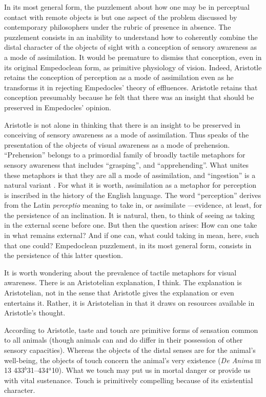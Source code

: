 In its most general form, the puzzlement about how one may be in perceptual contact with remote objects is but one aspect of the problem discussed by contemporary philosophers under the rubric of presence in absence. The puzzlement consists in an inability to understand how to coherently combine the distal character of the objects of sight with a conception of sensory awareness as a mode of assimilation. It would be premature to dismiss that conception, even in its original Empedoclean form, as primitive physiology of vision. Indeed, Aristotle retains the conception of perception as a mode of assimilation even as he transforms it in rejecting Empedocles' theory of effluences. Aristotle retains that conception presumably because he felt that there was an insight that should be preserved in Empedocles' opinion. 

Aristotle is not alone in thinking that there is an insight to be preserved in conceiving of sensory awareness as a mode of assimilation. Thus \citet{Broad:1952kx} speaks of the presentation of the objects of visual awareness as a mode of prehension.  ``Prehension'' belongs to a primordial family of broadly tactile metaphors for sensory awareness that includes ``grasping'', and ``apprehending''. What unites these metaphors is that they are all a mode of assimilation, and ``ingestion'' is a natural variant \citep[see][7]{Johnston:2006uq,Price:1932fk}. For what it is worth, assimilation as a metaphor for perception is inscribed in the history of the English language. The word ``perception'' derives from the Latin \emph{perceptio} meaning to take in, or assimilate \citep[102]{Burnyeat:1979mv}---evidence, at least, for the persistence of an inclination. It is natural, then, to think of seeing as taking in the external scene before one. But then the question arises: How can one take in what remains external? And if one can, what could taking in mean, here, such that one could? Empedoclean puzzlement, in its most general form, consists in the persistence of this latter question.

It is worth wondering about the prevalence of tactile metaphors for visual awareness. There is an Aristotelian explanation, I think. The explanation is Aristotelian, not in the sense that Aristotle gives the explanation or even entertains it. Rather, it is Aristotelian in that it draws on resources available in Aristotle's thought. 

According to Aristotle, taste and touch are primitive forms of sensation common to all animals (though animals can and do differ in their possession of other sensory capacities). Whereas the objects of the distal senses are for the animal's well-being, the objects of touch concern the animal's very existence (\emph{De Anima} \textsc{iii} 13 433\( ^{b} \)31--434\( ^{a} \)10). What we touch may put us in mortal danger or provide us with vital sustenance. Touch is primitively compelling because of its existential character.

